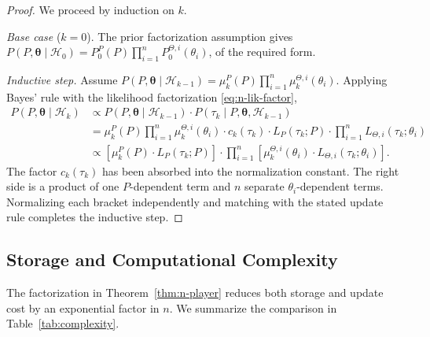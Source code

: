 \documentclass{article}
\begin{document}
\begin{proof}
We proceed by induction on $k$.

\textit{Base case} ($k=0$). The prior factorization assumption gives $P(P, \boldsymbol{\theta} \mid \mathcal{H}_0) = P_0^P(P) \prod_{i=1}^n P_0^{\Theta,i}(\theta_i)$, of the required form.

\textit{Inductive step.} Assume $P(P, \boldsymbol{\theta} \mid \mathcal{H}_{k-1}) = \mu_k^P(P) \prod_{i=1}^n \mu_k^{\Theta,i}(\theta_i)$. Applying Bayes' rule with the likelihood factorization \eqref{eq:n-lik-factor},
\begin{align}
P(P, \boldsymbol{\theta} \mid \mathcal{H}_k) &\propto P(P, \boldsymbol{\theta} \mid \mathcal{H}_{k-1}) \cdot P(\tau_k \mid P, \boldsymbol{\theta}, \mathcal{H}_{k-1}) \\
&= \mu_k^P(P) \prod_{i=1}^n \mu_k^{\Theta,i}(\theta_i) \cdot c_k(\tau_k) \cdot L_P(\tau_k; P) \cdot \prod_{i=1}^n L_{\Theta,i}(\tau_k; \theta_i) \\
&\propto \left[\mu_k^P(P) \cdot L_P(\tau_k; P)\right] \cdot \prod_{i=1}^n \left[\mu_k^{\Theta,i}(\theta_i) \cdot L_{\Theta,i}(\tau_k; \theta_i)\right].
\end{align}
The factor $c_k(\tau_k)$ has been absorbed into the normalization constant. The right side is a product of one $P$-dependent term and $n$ separate $\theta_i$-dependent terms. Normalizing each bracket independently and matching with the stated update rule completes the inductive step.
\end{proof}

\subsection{Storage and Computational Complexity}

The factorization in Theorem~\ref{thm:n-player} reduces both storage and update cost by an exponential factor in $n$. We summarize the comparison in Table~\ref{tab:complexity}.
\end{document}
